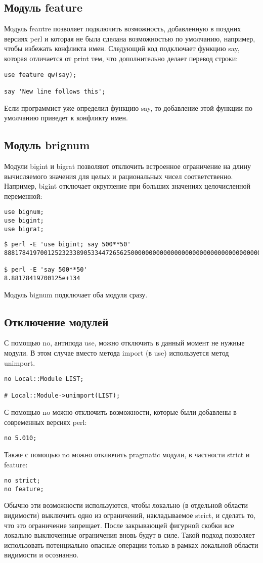 \subsection{Модуль feature} %
Модуль feautre позволяет подключить возможность, добавленную в поздних версиях perl и которая не была сделана возможностью по умолчанию, например, чтобы избежать конфликта имен. Следующий код подключает функцию say, которая отличается от print тем, что дополнительно делает перевод строки:
\begin{verbatim}
use feature qw(say);

say 'New line follows this';
\end{verbatim}
Если программист уже определил функцию say, то добавление этой функции по умолчанию приведет к конфликту имен.

\subsection{Модуль brignum} %
Модули bigint и bigrat позволяют отключить встроенное ограничение на длину вычисляемого значения для целых и рациональных чисел соответственно. Например, bigint отключает округление при больших значениях целочисленной переменной:
\begin{verbatim}
use bignum;
use bigint;
use bigrat;
\end{verbatim}
\begin{verbatim}
$ perl -E 'use bigint; say 500**50'
888178419700125232338905334472656250000000000000000000000000000000000000000000000000000000000000000000000000000000000000000000000000000

$ perl -E 'say 500**50'
8.88178419700125e+134
\end{verbatim}
Модуль bignum подключает оба модуля сразу.

\subsection{Отключение модулей} %
С помощью no, антипода use, можно отключить в данный момент не нужные модули. В этом случае вместо метода import (в use) используется метод unimport.
\begin{verbatim}
no Local::Module LIST;

# Local::Module->unimport(LIST);
\end{verbatim}
С помощью no можно отключить возможности, которые были добавлены в современных версиях perl:
\begin{verbatim}
no 5.010;
\end{verbatim}
Также с помощью no можно отключить pragmatic модули, в частности strict и feature:
\begin{verbatim}
no strict;
no feature;
\end{verbatim}
Обычно эти возможности используются, чтобы локально (в отдельной области видимости) выключить одно из ограничений, накладываемое strict, и сделать то, что это ограничение запрещает. После закрывающей фигурной скобки все локально выключенные ограничения вновь будут в силе. Такой подход позволяет использовать потенциально опасные операции только в рамках локальной области видимости и осознанно.


